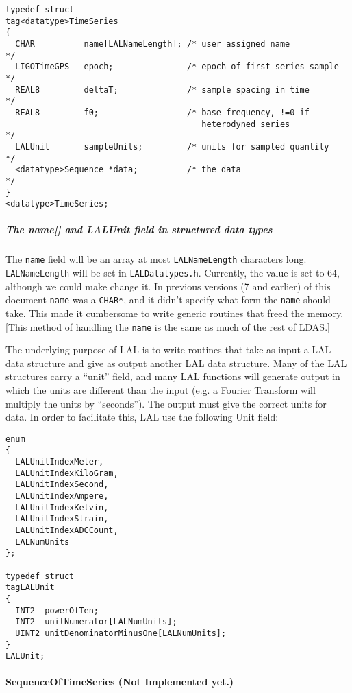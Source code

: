 \documentclass[]{ligodcc}
\renewcommand{\texttt}[1]{{\ttfamily\color{blue}#1}}
\begin{document}
{\footnotesize
\begin{verbatim}
typedef struct
tag<datatype>TimeSeries
{
  CHAR          name[LALNameLength]; /* user assigned name           */
  LIGOTimeGPS   epoch;               /* epoch of first series sample */
  REAL8         deltaT;              /* sample spacing in time       */
  REAL8         f0;                  /* base frequency, !=0 if
                                        heterodyned series           */
  LALUnit       sampleUnits;         /* units for sampled quantity   */
  <datatype>Sequence *data;          /* the data                     */
}
<datatype>TimeSeries;
\end{verbatim}}


\subparagraph{The {\texttt {name[]}} and {\texttt {LALUnit}} field 
in structured data types \\}
\label{name}

The {\tt name} field will be an array at most {\tt LALNameLength} characters long.
{\tt LALNameLength} will be set in {\tt LALDatatypes.h}.  Currently, the value is
set to 64, although we could make change it.  In previous versions (7
and earlier) of this document {\tt name} was a {\tt CHAR*}, and it didn't specify
what form the {\tt name} should take.  This made it cumbersome  to write
generic routines that freed the memory.  [This method of handling the
{\tt name} is the same as much of the rest of LDAS.] 

The underlying purpose of LAL is to write routines that take as input
a LAL data structure and give as output another LAL data structure.
Many of the LAL structures carry a ``unit'' field, and many LAL
functions will generate output in which the  units are different than
the input (e.g. a Fourier Transform will multiply the units by
``seconds'').  The output must give the correct units for data.  In
order to facilitate this, LAL use the following Unit field:

{\footnotesize
\begin{verbatim}
enum
{
  LALUnitIndexMeter,
  LALUnitIndexKiloGram,
  LALUnitIndexSecond,
  LALUnitIndexAmpere,
  LALUnitIndexKelvin,
  LALUnitIndexStrain,
  LALUnitIndexADCCount,
  LALNumUnits
};

typedef struct
tagLALUnit
{
  INT2  powerOfTen;
  INT2  unitNumerator[LALNumUnits];
  UINT2 unitDenominatorMinusOne[LALNumUnits];
}
LALUnit;
\end{verbatim}}


\paragraph{{\texttt {SequenceOfTimeSeries}}  {\bf (Not Implemented yet.)} \\}
\end{document}
